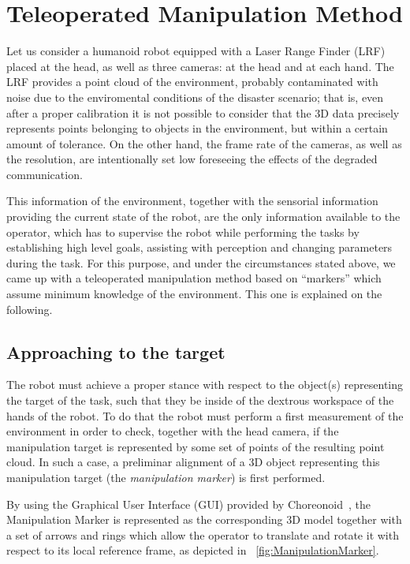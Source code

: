 \section{Teleoperated Manipulation Method}
	\label{sec:teleop_manip_method}
	
	Let us consider a humanoid robot equipped with a Laser Range Finder (LRF) placed at the head,
	as well as three cameras: at the head and at each hand.
	The LRF provides a point cloud of the environment, probably contaminated with noise due to the enviromental
	conditions of the disaster scenario; that is, even after a proper calibration it is not possible to consider
	that the 3D data precisely represents points belonging to objects in the environment, but within a certain
	amount of tolerance.
	On the other hand, the frame rate of the cameras, as well as the resolution, are intentionally set low
	foreseeing the effects of the degraded communication.
	
	This information of the environment, together with the sensorial information providing the current state of
	the robot, are the only information available to the operator, which has to supervise the robot while performing
	the tasks by establishing	high level goals, assisting with perception and changing parameters during the task.
	For this purpose, and under the circumstances stated above, we came up with a teleoperated manipulation method
	based on ``markers'' which assume minimum knowledge of the environment.
	This one is explained on the following.
	
	\subsection{Approaching to the target}
	
		The robot must achieve a proper stance with respect to the object(s) representing the target of the task,
		such that they be inside of the dextrous workspace of the hands of the robot.
		To do that the robot must perform a first measurement of the environment in order to check, together with the
		head camera, if the manipulation target is represented by some set of points of the resulting point cloud.
		In such a case, a preliminar alignment of a 3D object representing this manipulation target
		(the \emph{manipulation marker}) is first performed.
		
		By using the Graphical User Interface (GUI) provided by Choreonoid~\cite{Nakaoka_Choreonoid}, the Manipulation
		Marker is represented as the corresponding 3D model together with a set of arrows and rings which allow the
		operator to translate and rotate it with respect to its local reference frame,
		as depicted in \figurename~\ref{fig:ManipulationMarker}.
		
